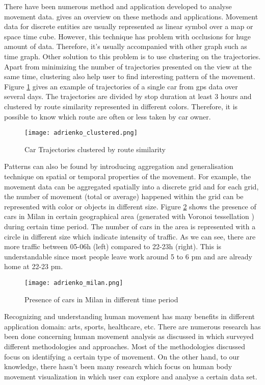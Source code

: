 There have been numerous method and application developed to analyse movement data. \cite{adrienko} gives an overview on these methods and applications. Movement data for discrete entities are usually represented as linear symbol over a map or space time cube. However, this technique has problem with occlusions for huge amount of data. Therefore, it's usually accompanied with other graph such as time graph. Other solution to this problem is to use clustering on the trajectories. Apart from minimizing the number of trajectories presented on the view at the same time, clustering also help user to find interesting pattern of the movement. Figure \ref{car_trajectory} \cite{adrienko_book} gives an example of trajectories of a single car from gps data over several days. The trajectories are divided by stop duration at least 3 hours and clustered by route similarity represented in different colors. Therefore, it is possible to know which route are often or less taken by car owner.

\begin{figure}
\centering
\texttt{[image: adrienko\_clustered.png]}
\caption{Car Trajectories clustered by route similarity}
\label{car_trajectory}
\end{figure}

Patterns can also be found by introducing aggregation and generalisation technique on spatial or temporal properties of the movement. For example, the movement data can be aggregated spatially into a discrete grid and for each grid, the number of movement (total or average) happened within the grid can be represented with color or objects in different size. Figure \ref{car_milan} \cite{adrienko_book} shows the presence of cars in Milan in certain geographical area (generated with Voronoi tessellation \cite{okabe}) during certain time period. The number of cars in the area is represented with a circle in different size which indicate intensity of traffic. As we can see, there are more traffic between 05-06h (left) compared to 22-23h (right). This is understandable since most people leave work around 5  to 6 pm and are already home at 22-23 pm.

\begin{figure}
\centering
\texttt{[image: adrienko\_milan.png]}
\caption{Presence of cars in Milan in different time period}
\label{car_milan}
\end{figure}

Recognizing and understanding human movement has many benefits in different application domain: arts\cite{heryadi,raptis}, sports\cite{bernard2013}, healthcare\cite{patsadu}, etc. There are numerous research has been done concerning human movement analysis as discussed in  \cite{gavrila} which surveyed different methodologies and approaches. Most of the methodologies discussed focus on identifying a certain type of movement. On the other hand, to our knowledge, there hasn't been many research which focus on human body movement visualization in which user can explore and analyse a certain data set. 

